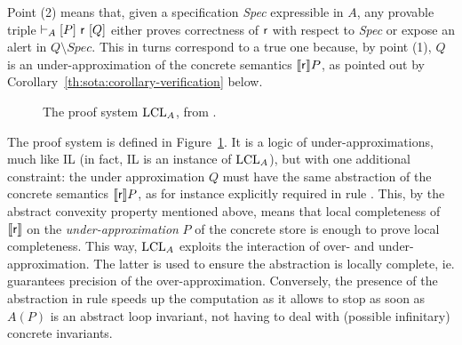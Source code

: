 Point (2) means that, given a specification \textit{Spec} expressible in $A$, any provable triple $\vdash_{A}\nobreak[P]~\mathsf{r}~[Q]$ either proves correctness of $\mathsf{r}$ with respect to \textit{Spec} or expose an alert in $Q \setminus \textit{Spec}$. This in turns correspond to a true one because, by point (1), $Q$ is an under-approximation of the concrete semantics $\llbracket\mathsf{r}\rrbracket P$, as pointed out by Corollary~\ref{th:sota:corollary-verification} below.

\begin{figure*}[t]
	\centering
	\begin{framed}
	\end{framed}
	\vspace{-1ex}
	\caption{The proof system $\text{LCL}_A$, from \cite{BGGR21}.}\label{fig:sota:lcla-rules}
\end{figure*}
The proof system is defined in Figure~\ref{fig:sota:lcla-rules}. It is a logic of under-approximations, much like IL (in fact, IL is an instance of $\text{LCL}_A$), but with one additional constraint: the under approximation $Q$ must have the same abstraction of the concrete semantics $\llbracket\mathsf{r}\rrbracket P$, as for instance explicitly required in rule . This, by the abstract convexity property mentioned above, means that local completeness of $\llbracket\mathsf{r}\rrbracket$ on the \emph{under-approximation} $P$ of the concrete store is enough to prove local completeness.
This way, $\text{LCL}_A$ exploits the interaction of over- and under-approximation. The latter is used to ensure the abstraction is locally complete, ie. guarantees precision of the over-approximation. Conversely, the presence of the abstraction in rule  speeds up the computation as it allows to stop as soon as $A(P)$ is an abstract loop invariant, not having to deal with (possible infinitary) concrete invariants.

